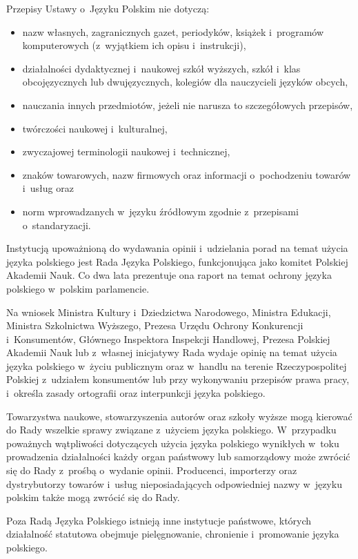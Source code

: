 \begin{multicols}{2}
Przepisy Ustawy o~Języku Polskim nie dotyczą: \begin{itemize} \item
nazw własnych, zagranicznych gazet, periodyków, książek
i~programów komputerowych (z~wyjątkiem ich opisu i~instrukcji),
\item działalności dydaktycznej i~naukowej szkół wyższych,
szkół i~klas obcojęzycznych lub dwujęzycznych, kolegiów dla
nauczycieli języków obcych, \item nauczania innych przedmiotów,
jeżeli nie narusza to szczegółowych przepisów, \item twórczości
naukowej i~kulturalnej, \item zwyczajowej terminologii naukowej
i~technicznej, \item znaków towarowych, nazw firmowych oraz
informacji o~pochodzeniu towarów i~usług oraz \item norm
wprowadzanych w~języku źródłowym zgodnie z~przepisami
o~standaryzacji. \end{itemize} 

Instytucją upoważnioną do wydawania opinii i~udzielania porad na
temat użycia języka polskiego jest Rada Języka Polskiego,
funkcjonująca jako komitet Polskiej Akademii Nauk. Co dwa lata
prezentuje ona raport na temat ochrony języka polskiego w~polskim
parlamencie. 

Na wniosek Ministra Kultury i~Dziedzictwa Narodowego, Ministra
Edukacji, Ministra Szkolnictwa Wyższego, Prezesa Urzędu Ochrony
Konkurencji i~Konsumentów, Głównego Inspektora Inspekcji Handlowej,
Prezesa Polskiej Akademii Nauk lub z~własnej inicjatywy Rada wydaje
opinię na temat użycia języka polskiego w~życiu publicznym oraz
w~handlu na terenie Rzeczypospolitej Polskiej z~udziałem konsumentów
lub przy wykonywaniu przepisów prawa pracy, i~określa zasady
ortografii oraz interpunkcji języka polskiego. 

Towarzystwa naukowe, stowarzyszenia autorów oraz szkoły wyższe
mogą kierować do Rady wszelkie sprawy związane z~użyciem języka
polskiego. W~przypadku poważnych wątpliwości dotyczących użycia
języka polskiego wynikłych w~toku prowadzenia działalności każdy
organ państwowy lub samorządowy może zwrócić się do Rady
z~prośbą o~wydanie opinii. Producenci, importerzy oraz dystrybutorzy
towarów i~usług nieposiadających odpowiedniej nazwy w~języku
polskim także mogą zwrócić się do Rady. 

Poza Radą Języka Polskiego istnieją inne instytucje państwowe,
których działalność statutowa obejmuje pielęgnowanie, chronienie
i~promowanie języka polskiego. 


\end{multicols}
